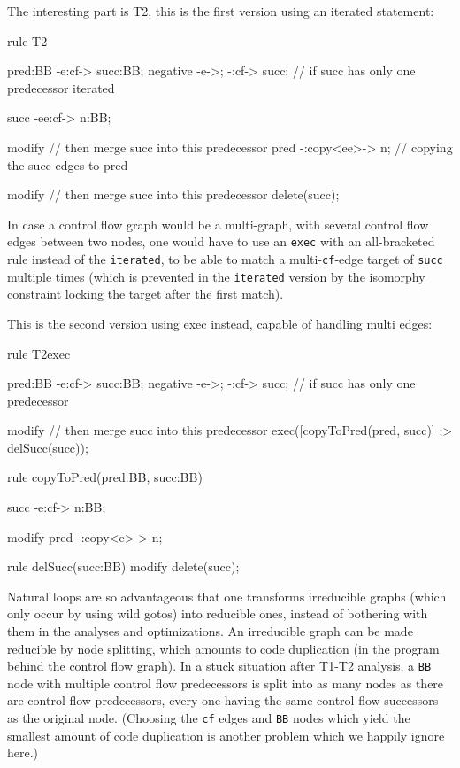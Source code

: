 The interesting part is T2, this is the first version using an iterated statement:

  \begin{example}
    \begin{grgen}
rule T2
{
  pred:BB -e:cf-> succ:BB;
  negative {
    -e->;
    -:cf-> succ; // if succ has only one predecessor
  }
  iterated {
    succ -ee:cf-> n:BB;

    modify { // then merge succ into this predecessor
      pred -:copy<ee>-> n; // copying the succ edges to pred
    }
  }

  modify { // then merge succ into this predecessor
    delete(succ);
  }
}
    \end{grgen}
  \end{example}

In case a control flow graph would be a multi-graph, with several control flow edges between two nodes, one would have to use an \texttt{exec} with an all-bracketed rule instead of the \texttt{iterated}, to be able to match a multi-\texttt{cf}-edge target of \texttt{succ} multiple times (which is prevented in the \texttt{iterated} version by the isomorphy constraint locking the target after the first match).

This is the second version using exec instead, capable of handling multi edges:

  \begin{example}
    \begin{grgen}
rule T2exec
{
  pred:BB -e:cf-> succ:BB;
  negative {
    -e->;
    -:cf-> succ; // if succ has only one predecessor
  }

  modify { // then merge succ into this predecessor
    exec([copyToPred(pred, succ)] ;> delSucc(succ));
  }
}

rule copyToPred(pred:BB, succ:BB)
{
  succ -e:cf-> n:BB;

  modify {
    pred -:copy<e>-> n;
  }
}

rule delSucc(succ:BB)
{
  modify {
    delete(succ);
  }
}
    \end{grgen}
  \end{example}

Natural loops are so advantageous that one transforms irreducible graphs (which only occur by using wild gotos) into reducible ones, instead of bothering with them in the analyses and optimizations.
An irreducible graph can be made reducible by node splitting, which amounts to code duplication (in the program behind the control flow graph).
In a stuck situation after T1-T2 analysis, a \texttt{BB} node with multiple control flow predecessors is split into as many nodes as there are control flow predecessors, every one having the same control flow successors as the original node.
(Choosing the \texttt{cf} edges and \texttt{BB} nodes which yield the smallest amount of code duplication is another problem which we happily ignore here.)

